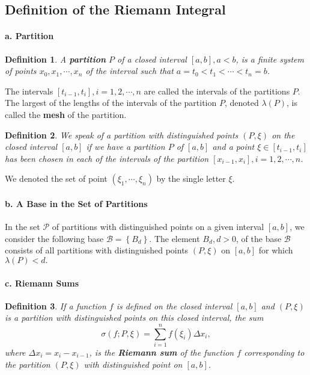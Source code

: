 \documentclass[a4paper,12pt]{article} %
\newtheorem{definition}{Definition}[section]
\begin{document}
\subsection{Definition of the Riemann Integral}
\paragraph{\rm \textbf{a. Partition}}
\begin{definition}
    \normalfont
    A \textbf{partition} $P$ of a closed interval $[a,b], a < b$, is a finite 
    system of points $x_0, x_1, \cdots, x_n$ of the interval such that 
    $a = t_0 < t_1 < \cdots < t_n = b$.
\end{definition}
The intervals $[t_{i-1},t_i], i=1,2,\cdots,n$ are called the intervals of the
partitions $P$. The largest of the lengths of the intervals of the 
partition $P$, denoted $\lambda(P)$, is called the \textbf{mesh} of the partition.

\begin{definition}
    \normalfont
    We speak of a partition with distinguished points $(P,\xi)$ on the 
    closed interval $[a,b]$ if we have a partition $P$ of $[a,b]$ and 
    a point $\xi \in [t_{i-1},t_i]$ has been chosen in each of the intervals 
    of the partition $[x_{i-1},x_i], i=1,2,\cdots,n$.
\end{definition}
We denoted the set of point $(\xi_1,\cdots,\xi_n)$ by the single letter $\xi$.

\paragraph{\rm \textbf{b. A Base in the Set of Partitions}}
In the set $\mathcal{P}$ of partitions with distinguished points on 
a given interval $[a,b]$, we consider the following base $\mathcal{B} = 
\left\{B_d\right\}.$ The element $B_d, d > 0$, of the base $\mathcal{B}$ consists of 
all partitions with distinguished points $(P,\xi)$ on $[a,b]$ for which 
$\lambda(P) < d.$

\paragraph{\rm \textbf{c. Riemann Sums}}
\begin{definition}
    \normalfont
    If a function $f$ is defined on the closed interval $[a,b]$ and 
    $(P,\xi)$ is a partition with distinguished points on this closed 
    interval, the sum 
    \begin{equation}
        \sigma(f;P,\xi) = \sum_{i=1}^nf(\xi_i)\Delta x_i,
    \end{equation}
    where $\Delta x_i = x_i - x_{i-1}$, is the \textbf{Riemann sum} of the function $f$
    corresponding to the partition $(P,\xi)$ with distinguished point on 
    $[a,b]$.
\end{definition}
\end{document}
